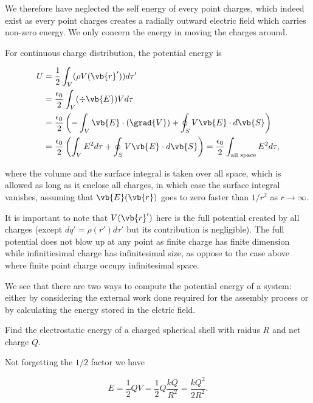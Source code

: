 \documentclass[english,a4paper,12pt]{report}
\begin{document}
We therefore have neglected the self energy of every point charges, which indeed exist as every point charges creates a radially outward electric field which carries non-zero energy. We only concern the energy in moving the charges around.

For continuous charge distribution, the potential energy is 

\begin{equation}
    \begin{aligned} 
    U &= \frac{1}{2} \int_{V}^{} ( \rho V(\vb{r} '))d\tau' \\
    &= \frac{\epsilon _{0} }{2}\int_{V}^{}  (\div{\vb{E} })Vd\tau  \\
    &= \frac{\epsilon _{0} }{2}\left( -\int_{V}^{} \vb{E} \cdot (\grad{V} ) + \oint_{S} V\vb{E} \cdot d\vb{S}   \right) \\
    &= \frac{\epsilon _{0} }{2}\left( \int_{V}^{} E^2d\tau + \oint_{S} V\vb{E} \cdot d\vb{S} \right) = \frac{\epsilon _{0} }{2} \int_{\text{all space}}^{} E^2d\tau ,
    \end{aligned}    
\end{equation}

where the volume and the surface integral is taken over all space, which is allowed as long as it enclose all charges, in which case the surface integral vanishes, assuming that \(\vb{E} (\vb{r} )\) goes to zero faster than \(1/r^2\) as \(r \to \infty\).   

It is important to note that \(V(\vb{r} ')\) here is the full potential created by all charges (except \(dq' = \rho (r') d\tau '\) but its contribution is negligible). The full potential does not blow up at any point as finite charge has finite dimension while infinitiesimal charge has infinitesimal size, as oppose to the case above where finite point charge occupy infinitesimal space. 

We see that there are two ways to compute the potential energy of a system: either by considering the external work done required for the assembly process or by calculating the energy stored in the elctric field.

{Find the electrostatic energy of a charged spherical shell with raidus \(R\) and net charge \(Q\).}
{Not forgetting the \(1/2\) factor we have 

\begin{equation}
    E = \frac{1}{2}QV = \frac{1}{2}Q \frac{kQ}{R^2} = \frac{kQ^2}{2R^2}.    
\end{equation}
~
}
\end{document}

